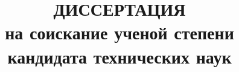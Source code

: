 \documentclass[%
candidate,   %
subf,        %
href,        %
colorlinks,  %
]{disser}
\begin{document}
	
\renewcommand*{\multicitedelim}{\addcomma\space}






\title{ДИССЕРТАЦИЯ\\
на соискание ученой степени\\
кандидата технических наук}

\maketitle

\tableofcontents



%









\printnomenclature

%

\printbibliography[heading=bibintoc, keyword=rus]
\printbibliography[heading=none, notkeyword=rus]


%

%
%
\end{document}
